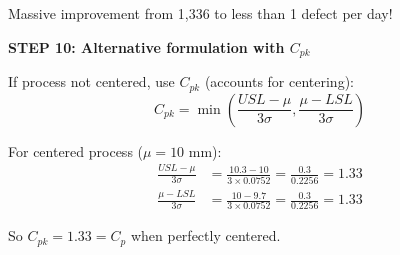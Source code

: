 \documentclass[12pt]{article}
\begin{document}
\begin{solution}
Massive improvement from 1,336 to less than 1 defect per day!

\textbf{STEP 10: Alternative formulation with $C_{pk}$}

If process not centered, use $C_{pk}$ (accounts for centering):
\[
C_{pk} = \min\left(\frac{USL - \mu}{3\sigma}, \frac{\mu - LSL}{3\sigma}\right)
\]

For centered process ($\mu = 10$ mm):
\begin{align*}
\frac{USL - \mu}{3\sigma} &= \frac{10.3 - 10}{3 \times 0.0752} = \frac{0.3}{0.2256} = 1.33 \\
\frac{\mu - LSL}{3\sigma} &= \frac{10 - 9.7}{3 \times 0.0752} = \frac{0.3}{0.2256} = 1.33
\end{align*}

So $C_{pk} = 1.33 = C_p$ when perfectly centered.

\end{solution}
\end{document}
